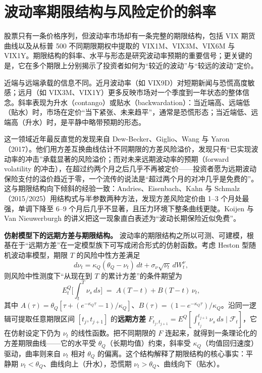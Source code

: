 \documentclass[11pt,a4paper]{ctexart}
\begin{document}
\section{波动率期限结构与风险定价的斜率}

股票只有一条价格序列，但波动率市场却有一条完整的期限结构，包括 VIX 期货曲线以及从标普 500 不同期限期权中提取的 VIX1M、VIX3M、VIX6M 与 VIX1Y。期限结构的斜率、水平与形态是研究波动率预期的重要信号；更关键的是，它在多个期限上分别揭示了投资者如何为“较近的波动”与“较远的波动”定价。

近端与远端承载的信息不同。近月波动率（如 VIX9D）对短期新闻与恐慌高度敏感；远月（如 VIX3M、VIX1Y）更多反映市场对一个季度到一年状态的整体信念。斜率表现为升水（contango）或贴水（backwardation）：当近端高、远端低（贴水）时，市场在定价“当下紧张、未来趋平”，通常是恐慌形态；当近端低、远端高（升水）时，是平静中略带预期的形态。

这一领域近年最反直觉的发现来自 Dew-Becker、Giglio、Wang 与 Yaron（2017）。他们用方差互换曲线估计不同期限的方差风险溢价，发现只有“已实现波动率的冲击”承载显著的风险溢价；而对未来远期波动率的预期（forward volatility 的冲击），在超过约两个月之后几乎不再被定价——投资者愿为远期波动保险支付的溢价趋近于零，一个流传的说法是“超过两个月的对冲几乎是免费的”。这与期限结构向下倾斜的经验一致：Andries、Eisenbach、Kahn 与 Schmalz（2015/2025）用结构式与半参数两种方法，发现方差风险定价由 1–3 个月处最强，单调下降至 6–9 个月后几乎不显著，且压力环境下整条曲线更陡。Koijen 与 Van Nieuwerburgh 的讲义把这一现象直白表述为“波动长期保险近似免费”。

\textbf{仿射模型下的远期方差与期限结构。} 波动率的期限结构之所以可测、可建模，根基在于“远期方差”在一定模型族下可写成闭合形式的仿射函数。考虑 Heston 型随机波动率模型，期限 $T$ 的风险中性方差满足
\[
d\nu_t=\kappa_Q(\theta_Q-\nu_t)\,dt+\sigma_\nu\sqrt{\nu_t}\,dW^\nu_t,
\]
则风险中性测度下“从现在到 $T$ 的累计方差”的条件期望为
\[
E^Q_t\!\Big[\int_t^T \nu_s\,ds\Big]
\;=\;A(T-t)+B(T-t)\,\nu_t,
\]
其中 $A(\tau)=\theta_Q[\tau + (e^{-\kappa_Q\tau}-1)/\kappa_Q]$、$B(\tau)=(1-e^{-\kappa_Q\tau})/\kappa_Q$。沿同一逻辑可提取任意期限区间 $[t_j,t_{j+1}]$ 的\textbf{远期方差} $F_{t_j,t_{j+1}}=E^Q[\int_{t_j}^{t_{j+1}}\nu_s\,ds\mid\mathcal F_t]$，它在仿射设定下仍为 $\nu_t$ 的线性函数。把不同期限的 $F$ 连起来，就得到一条理论化的方差期限曲线——它的水平受 $\theta_Q$（长期均值）约束，斜率受 $\kappa_Q$（均值回归速度）驱动，曲率则来自 $\nu_t$ 相对 $\theta_Q$ 的偏离。这个结构解释了期限结构的核心事实：平静期 $\nu_t<\theta_Q$、曲线向上（升水），恐慌期 $\nu_t>\theta_Q$、曲线向下（贴水）。
\end{document}
